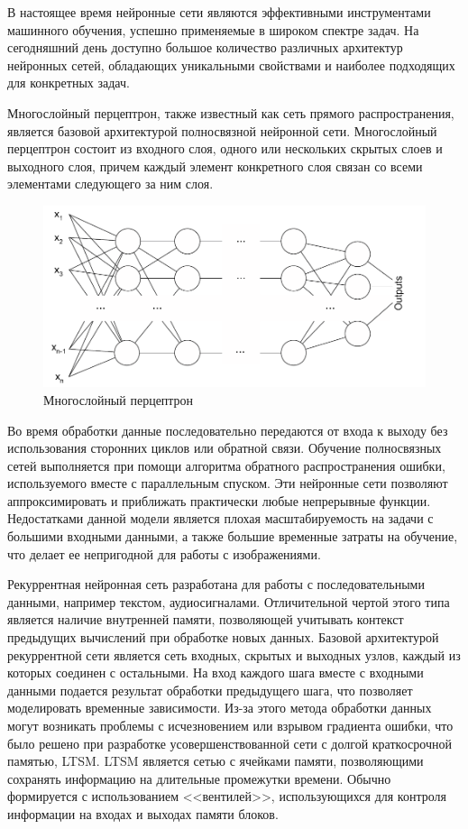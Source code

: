  В настоящее время нейронные сети являются эффективными инструментами машинного обучения, успешно применяемые в широком спектре задач. На сегодняшний день доступно большое количество различных архитектур нейронных сетей, обладающих уникальными свойствами и наиболее подходящих для конкретных задач.
 
 Многослойный перцептрон, также известный как сеть прямого распространения, является базовой архитектурой полносвязной нейронной сети. Многослойный перцептрон состоит из входного слоя, одного или нескольких скрытых слоев и выходного слоя, причем каждый элемент конкретного слоя связан со всеми элементами следующего за ним слоя.
 
\begin{figure}[h]
	\centering
	\includegraphics[width=0.7\linewidth]{images/MLP}
	\caption{Многослойный перцептрон}
	\label{fig:mlp}
\end{figure}

Во время обработки данные последовательно передаются от входа к выходу без использования сторонних циклов или обратной связи. Обучение полносвязных сетей выполняется при помощи алгоритма обратного распространения ошибки, используемого вместе с параллельным спуском.  Эти нейронные сети позволяют аппроксимировать и приближать практически любые непрерывные функции. Недостатками данной модели является плохая масштабируемость на задачи с большими входными данными, а также большие временные затраты на обучение, что делает ее непригодной для работы с изображениями.

Рекуррентная нейронная сеть разработана для работы с последовательными данными, например текстом, аудиосигналами. Отличительной чертой этого типа является наличие внутренней памяти, позволяющей учитывать контекст предыдущих вычислений при обработке новых данных. Базовой архитектурой рекуррентной сети является сеть входных, скрытых и выходных узлов, каждый из которых соединен с остальными. На вход каждого шага вместе с входными данными подается результат обработки предыдущего шага, что позволяет моделировать временные зависимости. Из-за этого метода обработки данных могут возникать проблемы с исчезновением или взрывом градиента ошибки, что было решено при разработке усовершенствованной сети с долгой краткосрочной памятью, LTSM. LTSM является сетью с ячейками памяти, позволяющими сохранять информацию на длительные промежутки времени. Обычно формируется с использованием <<вентилей>>, использующихся для контроля информации на входах и выходах памяти блоков.

